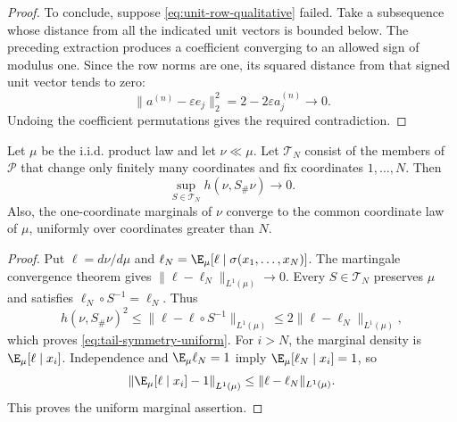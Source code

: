\begin{proof}
To conclude, suppose \eqref{eq:unit-row-qualitative} failed.
Take a subsequence whose distance from all the indicated unit vectors is
bounded below.
The preceding extraction produces a coefficient converging to an allowed sign
of modulus one.
Since the row norms are one, its squared distance from that signed unit
vector tends to zero:
\[
 \|a^{(n)}-\varepsilon e_j\|_2^2
       =2-2\varepsilon a_j^{(n)}\longrightarrow0.
\]
Undoing the coefficient permutations gives the required contradiction.
\end{proof}

\begin{lemma}
\label{lem:tail-symmetry-uniform}
Let $\mu$ be the i.i.d. product law and let $\nu\ll\mu$.  Let
$\mathcal T_N$ consist of the members of $\mathcal P$ that change only
finitely many coordinates and fix coordinates $1,\ldots,N$.
Then
\begin{equation}
 \sup_{S\in\mathcal T_N}h(\nu,S_\#\nu)\longrightarrow0.
 \label{eq:tail-symmetry-uniform}
\end{equation}
Also, the one-coordinate marginals of $\nu$ converge to the common
coordinate law of $\mu$, uniformly over coordinates greater than $N$.
\end{lemma}
\begin{proof}
Put $\ell=d\nu/d\mu$ and
$\ell_N=\E_\mu[\ell\mid\sigma(x_1,\ldots,x_N)]$.  The martingale
convergence theorem gives $\|\ell-\ell_N\|_{L^1(\mu)}\to0$.
Every $S\in\mathcal T_N$ preserves $\mu$ and satisfies
$\ell_N\circ S^{-1}=\ell_N$.  Thus
\[
 h(\nu,S_\#\nu)^2
 \leq\|\ell-\ell\circ S^{-1}\|_{L^1(\mu)}
 \leq2\|\ell-\ell_N\|_{L^1(\mu)},
\]
which proves \eqref{eq:tail-symmetry-uniform}.
For $i>N$, the marginal density is
$\E_\mu[\ell\mid x_i]$.  Independence and $\E_\mu\ell_N=1$ imply
$\E_\mu[\ell_N\mid x_i]=1$, so
\[
 \left\|\E_\mu[\ell\mid x_i]-1\right\|_{L^1(\mu)}
 \leq\|\ell-\ell_N\|_{L^1(\mu)}.
\]
This proves the uniform marginal assertion.
\end{proof}

